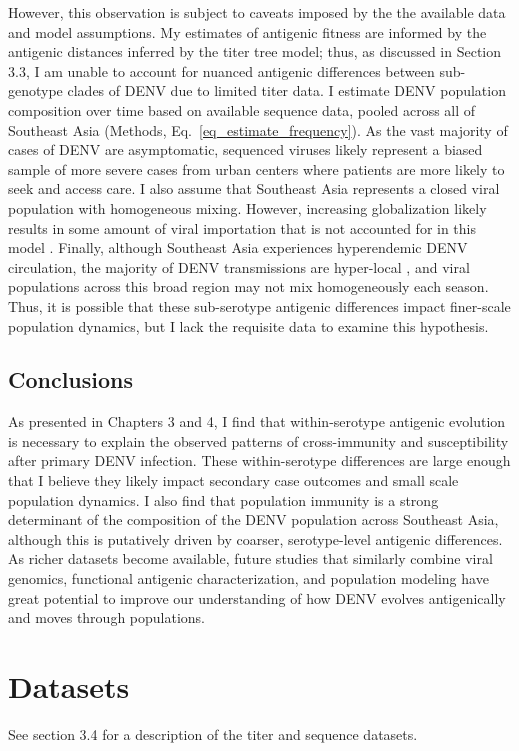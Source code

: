 However, this observation is subject to caveats imposed by the the available data and model assumptions.
My estimates of antigenic fitness are informed by the antigenic distances inferred by the titer tree model; thus, as discussed in Section 3.3, I am unable to account for nuanced antigenic differences between sub-genotype clades of DENV due to limited titer data.
I estimate DENV population composition over time based on available sequence data, pooled across all of Southeast Asia (Methods, Eq.~\ref{eq_estimate_frequency}).
As the vast majority of cases of DENV are asymptomatic, sequenced viruses likely represent a biased sample of more severe cases from urban centers where patients are more likely to seek and access care.
I also assume that Southeast Asia represents a closed viral population with homogeneous mixing.
However, increasing globalization likely results in some amount of viral importation that is not accounted for in this model \citep{allicock2012phylogeography}.
Finally, although Southeast Asia experiences hyperendemic DENV circulation, the majority of DENV transmissions are hyper-local \citep{salje2017dengue}, and viral populations across this broad region may not mix homogeneously each season.
Thus, it is possible that these sub-serotype antigenic differences impact finer-scale population dynamics, but I lack the requisite data to examine this hypothesis.

\subsection{Conclusions}
As presented in Chapters 3 and 4, I find that within-serotype antigenic evolution is necessary to explain the observed patterns of cross-immunity and susceptibility after primary DENV infection.
These within-serotype differences are large enough that I believe they likely impact secondary case outcomes and small scale population dynamics.
I also find that population immunity is a strong determinant of the composition of the DENV population across Southeast Asia, although this is putatively driven by coarser, serotype-level antigenic differences.
As richer datasets become available, future studies that similarly combine viral genomics, functional antigenic characterization, and population modeling have great potential to improve our understanding of how DENV evolves antigenically and moves through populations.

\clearpage
\section{Datasets}
See section 3.4 for a description of the titer and sequence datasets.

